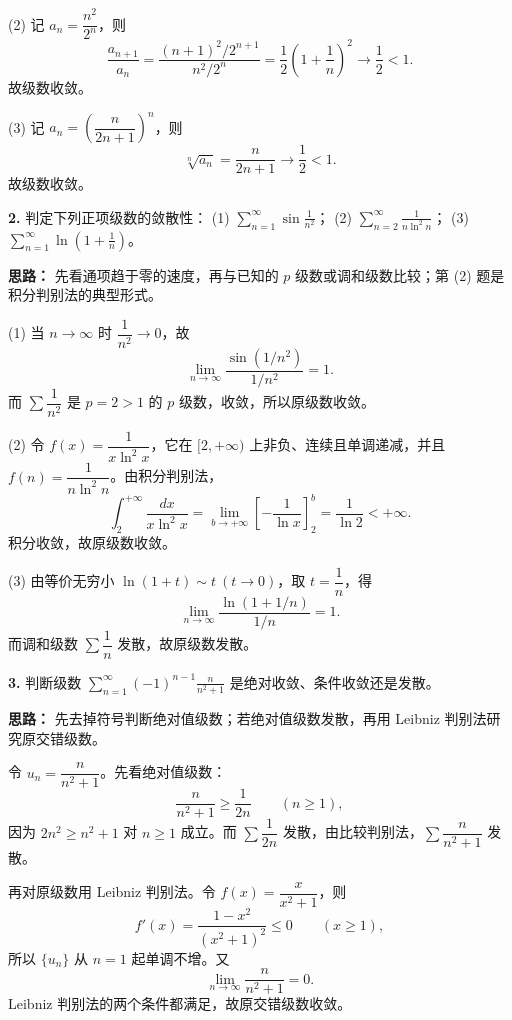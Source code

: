 (2) 记 $a_n=\dfrac{n^2}{2^n}$，则
\[
\frac{a_{n+1}}{a_n}
=\frac{(n+1)^2/2^{n+1}}{n^2/2^n}
=\frac12\left(1+\frac1n\right)^2\longrightarrow\frac12<1.
\]
故级数收敛。

(3) 记 $a_n=\left(\dfrac{n}{2n+1}\right)^n$，则
\[
\sqrt[n]{a_n}=\frac{n}{2n+1}\longrightarrow\frac12<1.
\]
故级数收敛。

\else \answerarea[8] \fi%

\textbf{2.} 判定下列正项级数的敛散性：
(1) $\displaystyle\sum_{n=1}^{\infty}\sin\frac{1}{n^2}$；
(2) $\displaystyle\sum_{n=2}^{\infty}\frac{1}{n\ln^2 n}$；
(3) $\displaystyle\sum_{n=1}^{\infty}\ln\left(1+\frac1n\right)$。

\ifshowsolutions%
\textbf{思路：} 先看通项趋于零的速度，再与已知的 $p$ 级数或调和级数比较；第 (2) 题是积分判别法的典型形式。

(1) 当 $n\to\infty$ 时 $\dfrac{1}{n^2}\to0$，故
\[
\lim_{n\to\infty}\frac{\sin(1/n^2)}{1/n^2}=1.
\]
而 $\sum\dfrac{1}{n^2}$ 是 $p=2>1$ 的 $p$ 级数，收敛，所以原级数收敛。

(2) 令 $f(x)=\dfrac{1}{x\ln^2 x}$，它在 $[2,+\infty)$ 上非负、连续且单调递减，并且 $f(n)=\dfrac{1}{n\ln^2 n}$。由积分判别法，
\[
\int_2^{+\infty}\frac{dx}{x\ln^2 x}
=\lim_{b\to+\infty}\left[-\frac{1}{\ln x}\right]_2^b
=\frac{1}{\ln2}<+\infty.
\]
积分收敛，故原级数收敛。

(3) 由等价无穷小 $\ln(1+t)\sim t\ (t\to0)$，取 $t=\dfrac1n$，得
\[
\lim_{n\to\infty}\frac{\ln(1+1/n)}{1/n}=1.
\]
而调和级数 $\sum\dfrac1n$ 发散，故原级数发散。

\else \answerarea[8] \fi%

\textbf{3.} 判断级数 $\displaystyle\sum_{n=1}^{\infty}(-1)^{n-1}\frac{n}{n^2+1}$ 是绝对收敛、条件收敛还是发散。

\ifshowsolutions%
\textbf{思路：} 先去掉符号判断绝对值级数；若绝对值级数发散，再用 Leibniz 判别法研究原交错级数。

令 $u_n=\dfrac{n}{n^2+1}$。先看绝对值级数：
\[
\frac{n}{n^2+1}\ge\frac{1}{2n}\qquad(n\ge1),
\]
因为 $2n^2\ge n^2+1$ 对 $n\ge1$ 成立。而 $\sum\dfrac{1}{2n}$ 发散，由比较判别法，$\sum\dfrac{n}{n^2+1}$ 发散。

再对原级数用 Leibniz 判别法。令 $f(x)=\dfrac{x}{x^2+1}$，则
\[
f'(x)=\frac{1-x^2}{(x^2+1)^2}\le0\qquad(x\ge1),
\]
所以 $\{u_n\}$ 从 $n=1$ 起单调不增。又
\[
\lim_{n\to\infty}\frac{n}{n^2+1}=0.
\]
Leibniz 判别法的两个条件都满足，故原交错级数收敛。

